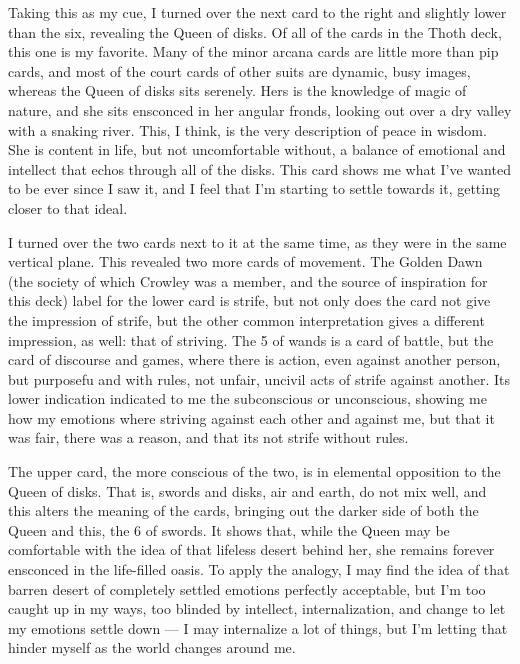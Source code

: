 Taking this as my cue, I turned over the next card to the right and
slightly lower than the six, revealing the Queen of disks.  Of all of
the cards in the Thoth deck, this one is my favorite.  Many of the minor
arcana cards are little more than pip cards, and most of the court cards
of other suits are dynamic, busy images, whereas the Queen of disks sits
serenely.  Hers is the knowledge of magic of nature, and she sits
ensconced in her angular fronds, looking out over a dry valley with a
snaking river.  This, I think, is the very description of peace in
wisdom.  She is content in life, but not uncomfortable without, a
balance of emotional and intellect that echos through all of the disks.
This card shows me what I've wanted to be ever since I saw it, and I
feel that I'm starting to settle towards it, getting closer to that
ideal.

I turned over the two cards next to it at the same time, as they were in
the same vertical plane.  This revealed two more cards of movement.  The
Golden Dawn (the society of which Crowley was a member, and the source
of inspiration for this deck) label for the lower card is strife, but not
only does the card not give the impression of strife, but the other
common interpretation gives a different impression, as well: that of
striving.  The 5 of wands is a card of battle, but the card of discourse and
games, where there is action, even against another person, but
purposefu and with rules, not unfair, uncivil acts of strife against
another.  Its lower indication indicated to me the subconscious or
unconscious, showing me how my emotions where striving against each
other and against me, but that it was fair, there was a reason, and that
its not strife without rules.

The upper card, the more conscious of the two, is in elemental
opposition to the Queen of disks.  That is, swords and disks, air and
earth, do not mix well, and this alters the meaning of the cards,
bringing out the darker side of both the Queen and this, the 6 of
swords.  It shows that, while the Queen may be comfortable with the idea
of that lifeless desert behind her, she remains forever ensconced in
the life-filled oasis.  To apply the analogy, I may find the idea of
that barren desert of completely settled emotions perfectly acceptable,
but I'm too caught up in my ways, too blinded by intellect,
internalization, and change to let my emotions settle down --- I may
internalize a lot of things, but I'm letting that hinder myself as the
world changes around me.


